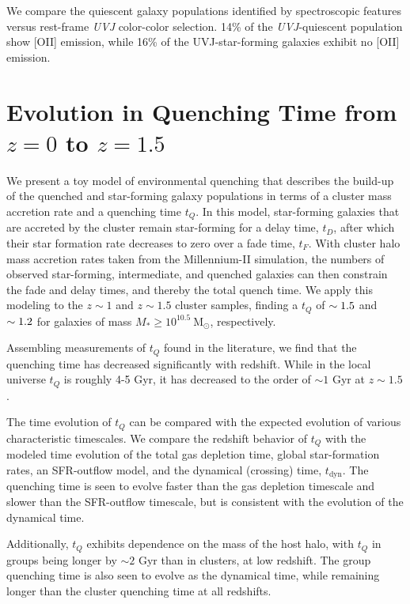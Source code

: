 
We compare the quiescent galaxy populations identified by spectroscopic features versus rest-frame \textit{UVJ} color-color selection.
14\% of the \textit{UVJ}-quiescent population show [O\textsc{II}] emission, while 16\% of the UVJ-star-forming galaxies exhibit no [O\textsc{II}] emission.


\section{Evolution in Quenching Time from $z=0$ to $z=1.5$}

We present a toy model of environmental quenching that describes the build-up of the quenched and star-forming galaxy populations in terms of a cluster mass accretion rate and a quenching time $t_Q$.
In this model, star-forming galaxies that are accreted by the cluster remain star-forming for a delay time, $t_D$, after which their star formation rate decreases to zero over a fade time, $t_F$.
With cluster halo mass accretion rates taken from the Millennium-\textsc{II} simulation, the numbers of observed star-forming, intermediate, and quenched galaxies can then constrain the fade and delay times, and thereby the total quench time.
We apply this modeling to the $z\sim1$ and $z\sim1.5$ cluster samples, finding a $t_Q$ of $\sim1.5$ and $\sim1.2$ for galaxies of mass $M_* \geq 10^{10.5}~\mathrm{M}_\odot$, respectively.

Assembling measurements of $t_Q$ found in the literature, we find that the quenching time has decreased significantly with redshift.
While in the local universe $t_Q$ is roughly 4-5 Gyr, it has decreased to the order of $\sim1$ Gyr at $z\sim1.5$.

The time evolution of $t_Q$ can be compared with the expected evolution of various characteristic timescales.
We compare the redshift behavior of $t_Q$ with the modeled time evolution of the total gas depletion time, global star-formation rates, an SFR-outflow model, and the dynamical (crossing) time, $t_\mathrm{dyn}$.
The quenching time is seen to evolve faster than the gas depletion timescale and slower than the SFR-outflow timescale, but is consistent with the evolution of the dynamical time.

Additionally, $t_Q$ exhibits dependence on the mass of the host halo, with $t_Q$ in groups being longer by $\sim2$ Gyr than in clusters, at low redshift.
The group quenching time is also seen to evolve as the dynamical time, while remaining longer than the cluster quenching time at all redshifts.

